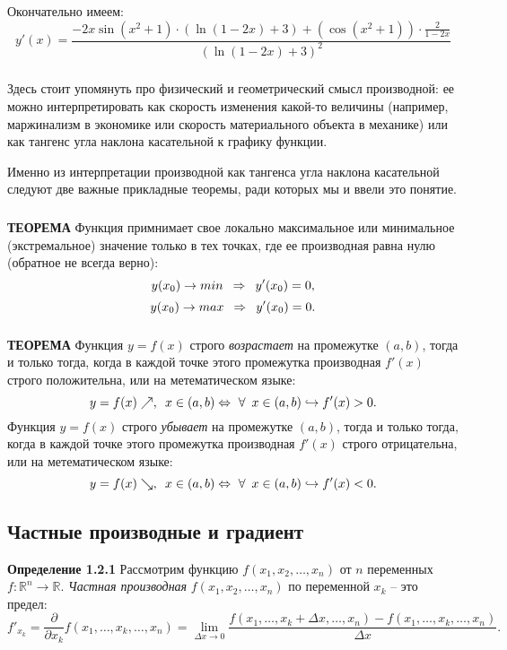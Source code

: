 \documentclass[12pt,a4paper]{article}
\begin{document}
Окончательно имеем:
\[ y'(x) = \frac{-2x\sin(x^2 + 1) \cdot (\ln(1-2x) + 3) + (\cos(x^2 + 1)) \cdot \frac{2}{1 - 2x}}{(\ln(1-2x) + 3)^2} \]

\subparagraph{}
Здесь стоит упомянуть про физический и геометрический смысл производной: ее можно интерпретировать как 
скорость изменения какой-то величины (например, маржинализм в экономике или скорость материального объекта в механике) или как тангенс угла наклона касательной к графику функции. 

Именно из интерпретации производной как тангенса угла наклона касательной следуют две важные прикладные теоремы, ради которых мы и ввели это понятие.

\subparagraph{}
\textbf{ТЕОРЕМА}
Функция примнимает свое локально максимальное или минимальное (экстремальное) значение только в тех точках, где ее производная равна нулю (обратное не всегда верно):
\[ y(x_0) \rightarrow min \hspace{5px} \Rightarrow \hspace{5px} y'(x_0) = 0,\]
\[ y(x_0) \rightarrow max \hspace{5px} \Rightarrow \hspace{5px} y'(x_0) = 0.\]

\subparagraph{}
\textbf{ТЕОРЕМА}
Функция $y = f(x)$ строго \textit{возрастает} на промежутке $(a, b)$, тогда и только тогда, когда в каждой точке этого промежутка производная $f'(x)$ строго положительна, или на метематическом языке:
\[ y = f(x) \nearrow, \hspace{5px} x \in (a, b) \Leftrightarrow\ \forall \hspace{5px} x \in (a, b) \hookrightarrow f'(x) > 0. \]
Функция $y = f(x)$ строго \textit{убывает} на промежутке $(a, b)$, тогда и только тогда, когда в каждой точке этого промежутка производная $f'(x)$ строго отрицательна, или на метематическом языке:
\[ y = f(x) \searrow, \hspace{5px} x \in (a, b) \Leftrightarrow\ \forall \hspace{5px} x \in (a, b) \hookrightarrow f'(x) < 0. \]


\subsection{Частные производные и градиент}
\textbf{Определение 1.2.1} 
Рассмотрим функцию $f(x_1, x_2, \ldots, x_n)$ от $n$ переменных $f: \mathbb{R}^n \longrightarrow \mathbb{R}$. \textit{Частная производная} $f(x_1, x_2, \ldots, x_n)$ по переменной $x_k$ -- это предел: \[ f'_{x_k} = \frac{\partial}{\partial x_k}f(x_1, \ldots, x_k, \ldots, x_n) = \lim_{\Delta x \to 0} \frac{f(x_1, \ldots, x_k + \Delta x, \ldots, x_n) - f(x_1, \ldots, x_k, \ldots, x_n)}{\Delta x}. \]
\end{document}

